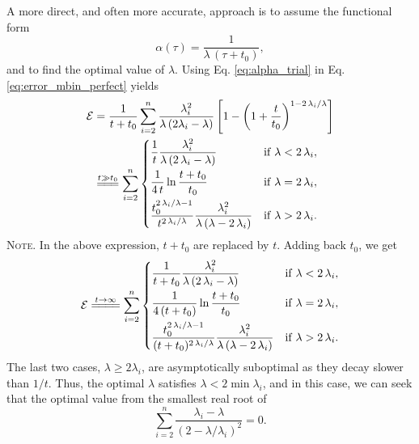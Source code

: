 \documentclass[reprint]{revtex4-1}
\newcommand{\note}[1]{{\color{DarkGreen}\footnotesize \textsc{Note.} #1}}
\begin{document}
A more direct, and often more accurate, approach
is to assume the functional form
%
\begin{equation}
\alpha(\tau) = \frac{1}{\lambda \, (\tau + t_0) },
\label{eq:alpha_trial}
\end{equation}
%
and to find the optimal value of $\lambda$.
%
Using Eq. \eqref{eq:alpha_trial}
in Eq. \eqref{eq:error_mbin_perfect} yields
%
\begin{align}
\mathcal E
&=
\frac{1}{t+t_0}
\sum_{i=2}^n \frac{ \lambda_i^2 } { \lambda \, (2 \lambda_i - \lambda) }
\left[
  1 - \left(
    1 + \frac{t}{t_0}
  \right)^{1 - 2 \, \lambda_i/\lambda}
\right]
\notag
\\
&\stackrel{      t \gg t_0      }
          { =\joinrel=\joinrel= }
%
\sum_{i = 2}^n
\begin{dcases}
  \frac{ 1 }
       { t }
  \frac{ \lambda_i^2 }
       { \lambda \, (2 \, \lambda_i - \lambda) }
  &
  \mathrm{if \;} \lambda < 2 \, \lambda_i,
  \\%
  \frac{   1    }
       { 4 \, t }
  \ln \frac{ t + t_0 }
           {  t_0    }
  &
  \mathrm{if \;} \lambda = 2 \, \lambda_i,
  \\%
  \frac{ t_0^{ 2 \, \lambda_i / \lambda  - 1} }
       { t^{ 2 \, \lambda_i / \lambda } }
  \frac{ \lambda_i^2 }
       { \lambda \, (\lambda - 2 \, \lambda_i) }
  &
  \mathrm{if \;} \lambda > 2 \, \lambda_i.
\end{dcases}
\label{eq:y2_sum_perfect_invt}
\end{align}
%
\note{In the above expression,
$t + t_0$ are replaced by $t$.
%
Adding back $t_0$, we get
$$
\begin{aligned}
  \mathcal E
  \stackrel{         t \to \infty         }
           { =\joinrel=\joinrel=\joinrel= }
  \sum_{i = 2}^n
  \begin{dcases}
    \frac{ 1 }{ t + t_0 }
    \frac{ \lambda_i^2 } { \lambda \, (2 \, \lambda_i - \lambda) }
    &
    \mathrm{if \;} \lambda < 2 \, \lambda_i,
    \\%
    \frac{1}{4 \, (t + t_0) } \ln\frac{t + t_0}{t_0}
    &
    \mathrm{if \;} \lambda = 2 \, \lambda_i,
    \\
    \frac{ t_0^{ 2 \, \lambda_i / \lambda  - 1} }
         { (t + t_0)^{ 2 \, \lambda_i / \lambda } }
    \frac{ \lambda_i^2 }
         { \lambda \, (\lambda - 2 \, \lambda_i) }
    &
    \mathrm{if \;} \lambda > 2 \, \lambda_i.
  \end{dcases}
\end{aligned}
$$
}
%
The last two cases, $\lambda \ge 2\lambda_i$,
are asymptotically suboptimal
as they decay slower than $1/t$.
%
Thus, the optimal $\lambda$
satisfies $\lambda < 2 \min \lambda_i$,
and in this case,
we can seek that
the optimal value from
the smallest real root of
%
\begin{equation}
\sum_{i = 2}^n
\frac{ \lambda_i - \lambda }
{ \left(2 - \lambda/ \lambda_i \right)^2 }
= 0.
\label{eq:optimal_lambda_approx}
\end{equation}
\end{document}
